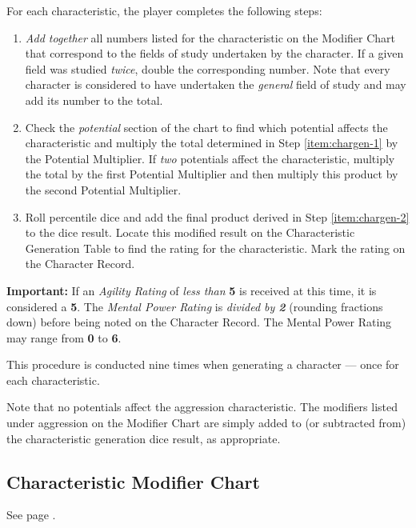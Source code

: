 For each characteristic, the player completes the following steps:  

\begin{enumerate}
\item \emph{Add together} all numbers listed for the characteristic
  on the Modifier Chart that correspond to the fields of study
  undertaken by the character. If a given field was studied
  \emph{twice}, double the corresponding number. Note that every
  character is considered to have undertaken the \emph{general} field
  of study and may add its number to the total.\label{item:chargen-1}
\item Check the \emph{potential} section of the chart to find which
  potential affects the characteristic and multiply the total
  determined in Step \ref{item:chargen-1} by the Potential Multiplier.
  If \emph{two} potentials affect the characteristic, multiply the
  total by the first Potential Multiplier and then multiply this
  product by the second Potential Multiplier.\label{item:chargen-2}
\item Roll percentile dice and add the final product derived in Step
  \ref{item:chargen-2} to the dice result. Locate this modified result
  on the Characteristic Generation Table to find the rating for the
  characteristic. Mark the rating on the Character Record.
\end{enumerate}

\textbf{Important:} If an \emph{Agility Rating} of \emph{less than}
\textbf{5} is received at this time, it is considered a \textbf{5}.
The \emph{Mental Power Rating} is \emph{divided by \textbf{2}}
(rounding fractions down) before being noted on the Character Record.
The Mental Power Rating may range from \textbf{0} to \textbf{6}.

This procedure is conducted nine times when generating a
character --- once for each characteristic.

Note that no potentials affect the aggression characteristic. The
modifiers listed under aggression on the Modifier Chart are simply
added to (or subtracted from) the characteristic generation dice
result, as appropriate.


\subsection{Characteristic Modifier Chart}
\label{sec:char-modif-chart}

See page \pageref{tab:char-mod}.

